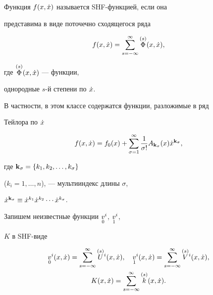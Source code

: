 \begin{defnnonum} Функция $f(x,\xt)$ называется SHF-функцией, если она


представима в виде поточечно сходящегося ряда


$$


f(x,\xt) = \sum^{\infty}_{s=-\infty}\up{\Phi}{(s)}(x,\xt),


$$


где $\up{\Phi}{(s)}(x,\xt)$ --- функции, 


однородные $s$-й степени по $\xt $.


В частности, в этом классе содержатся функции, разложимые в ряд


Тейлора по $\xt $


$$


f(x,\xt) = f_{0}(x) +


\sum^{\infty }_{\sigma =1}\frac{1}{\sigma !}


A_{{\bold k}_{\sigma }}(x)


\xt^{{\bold k}_{\sigma }},


$$


где ${\bold k}_{\sigma} = \{k_{1},k_{2},\dotsc ,k_{\sigma }\}$ 


($k_{i} = 1,\dotsc ,n$), --- мультииндекс длины $\sigma $,


$\xt^{{\bold k}_{\sigma }} \equiv 


\xt^{k_{1}}\xt^{k_{2}}\dotsb


\xt^{k_{\sigma }}$.


\end{defnnonum}





Запишем неизвестные функции $\sd{v}{0}^{i}$, $\sd{v}{1}^{i}$,


$K$ в SHF-виде


\begin{gather*}


\sd{v}{0}^{i}(x,\xt) = 


\sum^{\infty }_{s=-\infty }\up{U}{(s)}{}^i(x,\xt),\quad 


\sd{v}{1}^{i}(x,\xt) = 


\sum^{\infty }_{s=-\infty }\up{V}{(s)}{}^i(x,\xt), \\


K(x,\xt) = 


\sum^{\infty }_{s=-\infty }\up{k}{(s)}(x,\xt).


\end{gather*}


